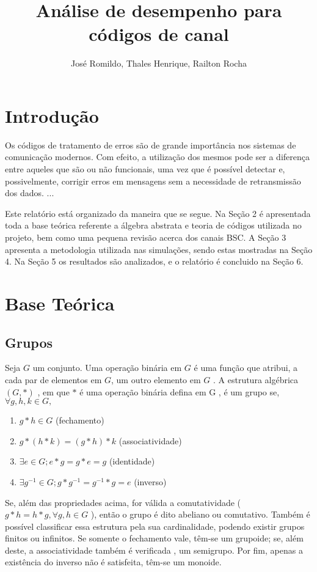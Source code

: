 \documentclass[]{article}
\title{ An{\'a}lise de desempenho para c{\'o}digos de canal}
\author{Jos{\'e} Romildo, Thales Henrique, Railton Rocha}
\begin{document}
\maketitle

\section{Introdução}

\par
Os códigos de tratamento de erros são de grande importância nos sistemas de comunicação modernos. Com efeito, a utilização dos mesmos pode ser a diferença entre aqueles que são ou não funcionais, uma vez que é possível detectar e, possivelmente, corrigir erros em mensagens sem a necessidade de retransmissão dos dados. 
...

Este relatório está organizado da maneira que se segue. Na Seção 2 é apresentada toda a base teórica referente a álgebra abstrata e teoria de códigos utilizada no projeto, bem como uma pequena revisão acerca dos canais BSC. A Seção 3 apresenta a metodologia utilizada nas simulações, sendo estas mostradas na Seção 4. Na Seção 5 os resultados são analizados, e o relatório é concluido na Seção 6.



\section{Base Teórica}
\subsection{Grupos}

Seja $G$ um conjunto. Uma operação binária em $G$ é uma função que atribui, a cada par de elementos em $G$, um outro elemento em $G$ . A estrutura algébrica  $(G , *)$ , em que $*$ é uma operação binária defina em G , é um grupo se, $\forall g , h , k \in G,$

\begin{enumerate}
	\item $g * h \in G$ (fechamento)
	\item $ g * (h * k) = (g*h)*k$ (associatividade)
	\item $ \exists e \in G ; e * g = g * e = g $ (identidade)
	\item $ \exists g^{-1} \in G;  g*g^{-1} = g^{-1} *g=e $ (inverso)
\end{enumerate}

Se, além das propriedades acima, for válida a comutatividade ( $ g*h = h*g , \forall g , h \in G$ ), então o grupo é dito abeliano ou comutativo. Também é possível classificar essa estrutura pela sua cardinalidade, podendo existir grupos finitos ou infinitos.
Se somente o fechamento vale, têm-se um grupoide; se, além deste, a associatividade também é verificada , um semigrupo. Por fim, apenas a existência do inverso não é satisfeita, têm-se um monoide.
\end{document}
